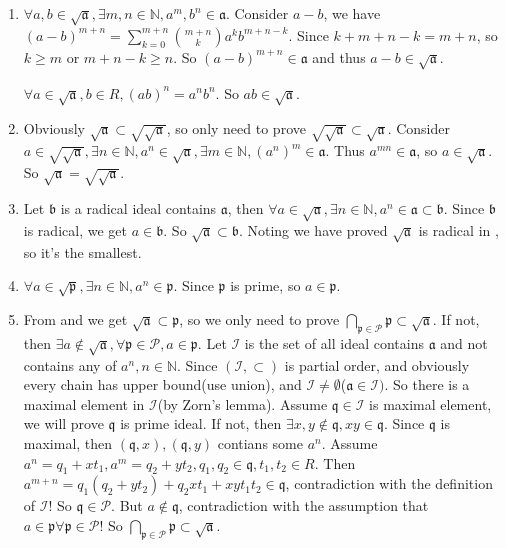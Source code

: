 \documentclass{ctexart}
\newcommand\<{\langle}
\renewcommand\>{\rangle}
\newcommand\N{\mathbb{N}}
\newcommand{\fra}{\mathfrak{a}}
\newcommand{\frb}{\mathfrak{b}}
\newcommand{\frp}{\mathfrak{p}}
\begin{document}
\begin{solution}
  \begin{enumerate}
    \item $\forall a,b\in\sqrt{\fra},\exists m,n\in\N,a^m,b^n\in \fra$. Consider $a-b$, we have $(a-b)^{m+n}=\sum_{k=0}^{m+n}\binom{m+n}{k}a^kb^{m+n-k}$. Since $k+m+n-k=m+n$, so $k\geq m$ or $m+n-k\geq n$. So $(a-b)^{m+n}\in\fra$ and thus $a-b\in\sqrt{\fra}$.

      $\forall a\in\sqrt{\fra},b\in R,(ab)^n=a^nb^n$. So $ab\in\sqrt{\fra}$.
    \item  Obviously $\sqrt{\fra}\subset\sqrt{\sqrt{\fra}}$, so only need to prove $\sqrt{\sqrt{\fra}}\subset \sqrt{\fra}$. Consider $a\in \sqrt{\sqrt{\fra}},\exists n\in\N,a^n\in\sqrt{\fra},\exists m\in\N,(a^n)^m\in\fra$. Thus $a^{mn}\in\fra$, so $a\in\sqrt{\fra}$. So $\sqrt{\fra}=\sqrt{\sqrt{\fra}}$.
    \item Let $\frb$ is a radical ideal contains $\fra$, then $\forall a\in\sqrt{\fra},\exists n\in\N,a^n\in\fra\subset\frb$.
      Since $\frb$ is radical, we get $a\in\frb$. So $\sqrt{\fra}\subset \frb$.
      Noting we have proved $\sqrt{\fra}$ is radical in , so it's the smallest.
    \item $\forall a\in\sqrt{\frp},\exists n\in\N,a^n\in\frp$. Since $\frp$ is prime, so $a\in\frp$.
    \item From  and  we get $\sqrt{\fra}\subset \frp$, so we only need to prove $\bigcap_{\frp\in\mathcal{P}}\frp\subset \sqrt{\fra}$. If not, then $\exists a\notin \sqrt{\fra},\forall \frp\in\mathcal{P},a\in\frp$. Let $\mathcal{I}$ is the set of all ideal contains $\fra$ and not contains any of $a^n,n\in\N$. Since $(\mathcal{I},\subset)$ is partial order, and obviously every chain has upper bound(use union), and $\mathcal{I}\neq \emptyset$($\fra\in\mathcal{I})$. So there is a maximal element in $\mathcal{I}$(by Zorn's lemma). Assume $\mathfrak{q}\in \mathcal{I}$ is maximal element, we will prove $\mathfrak{q}$ is prime ideal. If not, then $\exists x,y\notin\mathfrak{q},xy\in \mathfrak{q}$. Since $\mathfrak{q}$ is maximal, then $(\mathfrak{q},x),(\mathfrak{q},y)$ contians some $a^n$. Assume $a^n=q_1+xt_1,a^m=q_2+yt_2,q_1,q_2\in \mathfrak{q},t_1,t_2\in R$. Then $a^{m+n}=q_1(q_2+yt_2)+q_2xt_1+xyt_1t_2\in \mathfrak{q}$, contradiction with the definition of $\mathcal{I}$! So $\mathfrak{q}\in\mathcal{P}$. But $a\notin \mathfrak{q}$, contradiction with the assumption that $a\in\frp\forall\frp\in\mathcal{P}$! So $\bigcap_{\frp\in\mathcal{P}}\frp\subset \sqrt{\fra}$.
  \end{enumerate}
\end{solution}
\end{document}
